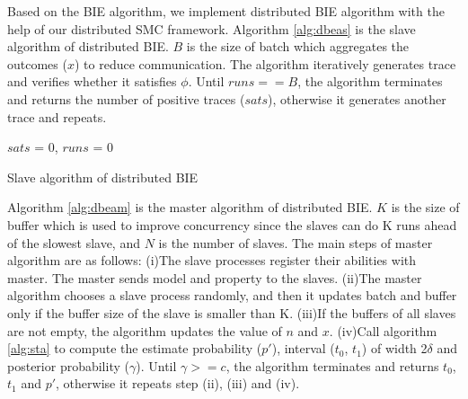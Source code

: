 Based on the BIE algorithm, we implement distributed BIE algorithm with the help of our distributed SMC framework. Algorithm \ref{alg:dbeas} is the slave algorithm of distributed BIE. $B$ is the size of batch which aggregates the outcomes ($x$) to reduce communication. The algorithm iteratively generates trace and verifies whether it satisfies $\phi$. Until $runs == B$, the algorithm terminates and returns the number of positive traces ($sats$), otherwise it generates another trace and repeats.

\begin{algorithm}[t]
{}
$sats$ = 0, $runs$ = 0\;
\caption{Slave algorithm of distributed BIE}
\label{alg:dbeas}
\end{algorithm}

Algorithm \ref{alg:dbeam} is the master algorithm of distributed BIE. $K$ is the size of buffer which is used to improve concurrency since the slaves can do K runs ahead of the slowest slave, and $N$ is the number of slaves. The main steps of master algorithm are as follows: (i)The slave processes register their abilities with master. The master sends model and property to the slaves. (ii)The master algorithm chooses a slave process randomly, and then it updates batch and buffer only if the buffer size of the slave is smaller than K. (iii)If the buffers of all slaves are not empty, the algorithm updates the value of $n$ and $x$. (iv)Call algorithm \ref{alg:sta} to compute the estimate probability ($p'$), interval ($t_0$, $t_1$) of width 2$\delta$ and posterior probability ($\gamma$). Until $\gamma >= c$, the algorithm terminates and returns $t_0$, $t_1$ and $p'$, otherwise it repeats step (ii), (iii) and (iv).

